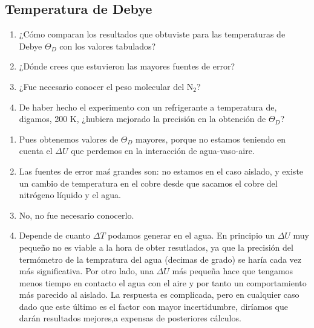 \begin{Enunciado}
	\subsection*{Temperatura de Debye}
	\begin{enumerate}[label=\alph*)]
		\item ¿Cómo comparan los resultados que obtuviste para las temperaturas de Debye \( \Theta_D \) con los valores tabulados?
		\item ¿Dónde crees que estuvieron las mayores fuentes de error?
		\item ¿Fue necesario conocer el peso molecular del \( \text{N}_2 \)?
		\item De haber hecho el experimento con un refrigerante a temperatura de, digamos, 200 K, ¿hubiera mejorado la precisión en la obtención de \( \Theta_D \)?
	\end{enumerate}
\end{Enunciado}
\begin{enumerate}[label=\alph*)]
	\item Pues obtenemos valores de $\Theta_D$ mayores, porque no estamos teniendo en cuenta el $\Delta U$ que perdemos en la interacción de agua-vaso-aire. 
	\item Las fuentes de error maś grandes son: no estamos en el caso aislado, y existe un cambio de temperatura en el cobre desde que sacamos el cobre del nitrógeno líquido y el agua. 
	\item No, no fue necesario conocerlo.
	\item Depende de cuanto $\Delta T$ podamos generar en el agua. En principio un $\Delta U$ muy pequeño no es viable a la hora de obter resutlados, ya que la precisión del termómetro de la tempratura del agua (decimas de grado) se haría cada vez más significativa. Por otro lado, una $\Delta U$ más pequeña hace que tengamos menos tiempo en contacto el agua con el aire y por tanto un comportamiento más parecido al aislado. La respuesta es complicada, pero en cualquier caso dado que este último es el factor con mayor incertidumbre, diríamos que darán resultados mejores,a expensas de posteriores cálculos.
\end{enumerate}

\vspace*{2em}

